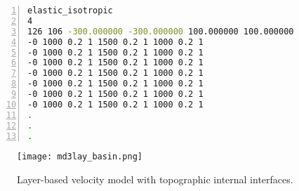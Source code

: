 \begin{lstlisting}[language=bash, caption=Example of .md3lay file,
   numbers=left, numbersep=5pt,numberstyle=\tiny\color{codegray}, commentstyle=\color{codegreen},
    label={lst_medium_md3lay},
   frame=tb]
elastic_isotropic
4
126 106 -300.000000 -300.000000 100.000000 100.000000
-0 1000 0.2 1 1500 0.2 1 1000 0.2 1
-0 1000 0.2 1 1500 0.2 1 1000 0.2 1
-0 1000 0.2 1 1500 0.2 1 1000 0.2 1
-0 1000 0.2 1 1500 0.2 1 1000 0.2 1
-0 1000 0.2 1 1500 0.2 1 1000 0.2 1
-0 1000 0.2 1 1500 0.2 1 1000 0.2 1
-0 1000 0.2 1 1500 0.2 1 1000 0.2 1
.
.
.
\end{lstlisting}

\begin{figure}
    \centering
    \texttt{[image: md3lay\_basin.png]}
    \caption{Layer-based velocity model with topographic internal interfaces.}
    \label{fig_md3lay}
\end{figure}


